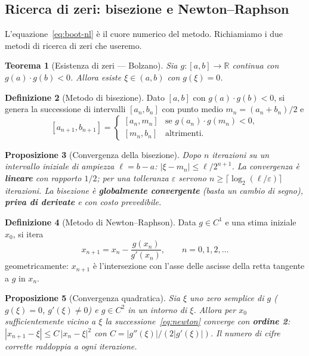\documentclass[11pt,a4paper]{article}
\theoremstyle{plain}
\newtheorem{teorema}{Teorema}[section]
\newtheorem{proposizione}[teorema]{Proposizione}
\theoremstyle{definition}
\newtheorem{definizione}[teorema]{Definizione}
\theoremstyle{remark}
\newcommand{\R}{\mathbb{R}}
\newcommand{\abs}[1]{\left\lvert #1 \right\rvert}
\begin{document}
\subsection{Ricerca di zeri: bisezione e Newton--Raphson}
\label{sec:zeri}

L'equazione~\eqref{eq:boot-nl} \`e il cuore numerico del metodo. Richiamiamo i due metodi di
ricerca di zeri che useremo.

\begin{teorema}[Esistenza di zeri --- Bolzano]
\label{thm:bolzano}
Sia $g:[a,b]\to\R$ continua con $g(a)\cdot g(b)<0$. Allora esiste $\xi\in(a,b)$ con $g(\xi)=0$.
\end{teorema}

\begin{definizione}[Metodo di bisezione]
Dato $[a,b]$ con $g(a)\cdot g(b)<0$, si genera la successione di intervalli $[a_n,b_n]$ con
punto medio $m_n=(a_n+b_n)/2$ e
\[
  [a_{n+1},b_{n+1}] = \begin{cases}
    [a_n,m_n] & \text{se } g(a_n)\cdot g(m_n)<0,\\
    [m_n,b_n] & \text{altrimenti.}
  \end{cases}
\]
\end{definizione}

\begin{proposizione}[Convergenza della bisezione]
\label{prop:bisez}
Dopo $n$ iterazioni su un intervallo iniziale di ampiezza $\ell=b-a$: $\abs{\xi-m_n}\le
\ell/2^{n+1}$. La convergenza \`e \textbf{lineare} con rapporto $1/2$; per una tolleranza
$\varepsilon$ servono $n\ge\lceil\log_2(\ell/\varepsilon)\rceil$ iterazioni. La bisezione \`e
\textbf{globalmente convergente} (basta un cambio di segno), \textbf{priva di derivate} e con
costo prevedibile.
\end{proposizione}

\begin{definizione}[Metodo di Newton--Raphson]
Data $g\in C^1$ e una stima iniziale $x_0$, si itera
\begin{equation}
  \label{eq:newton}
  x_{n+1} = x_n - \frac{g(x_n)}{g'(x_n)}, \qquad n=0,1,2,\ldots
\end{equation}
geometricamente: $x_{n+1}$ \`e l'intersezione con l'asse delle ascisse della retta tangente a
$g$ in $x_n$.
\end{definizione}

\begin{proposizione}[Convergenza quadratica]
\label{prop:newton}
Sia $\xi$ uno zero semplice di $g$ ($g(\xi)=0$, $g'(\xi)\neq 0$) e $g\in C^2$ in un intorno di
$\xi$. Allora per $x_0$ sufficientemente vicino a $\xi$ la successione~\eqref{eq:newton}
converge con \textbf{ordine 2}: $\abs{x_{n+1}-\xi}\le C\,\abs{x_n-\xi}^2$ con
$C=\abs{g''(\xi)}/(2\abs{g'(\xi)})$. Il numero di cifre corrette \emph{raddoppia} a ogni
iterazione.
\end{proposizione}
\end{document}

